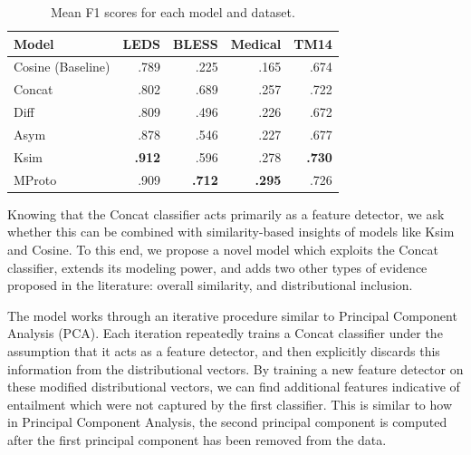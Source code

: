 \documentclass[12pt]{article}
\begin{document}
\begin{table}
\begin{center}
\begin{tabular}{|l|rrrr|}
  \hline
  Model                           &   LEDS   &  BLESS   &   Medical &      TM14  \\
  \hline
  Cosine (Baseline)               &    .789  &    .225  &    .165  &      .674  \\
  \hline
  Concat                          &    .802  &    .689  &    .257  &      .722  \\
  Diff                            &    .809  &    .496  &    .226  &      .672  \\
  Asym \cite{roller:2014:coling}  &    .878  &    .546  &    .227  &      .677  \\
  Ksim \cite{levy:2015:naacl}     &{\bf.912} &    .596  &{   .278} &  {\bf.730} \\
  MProto \cite{roller:2016:emnlp} &    .909  &{\bf.712} &{\bf.295} &      .726  \\
  \hline
\end{tabular}
\end{center}
\caption{Mean F1 scores for each model and dataset.}
\label{tab:results1}
\end{table}







Knowing that the Concat classifier acts primarily as a feature detector, we
ask whether this can be combined with similarity-based insights of models like
Ksim and Cosine. To this end, we propose a novel model which exploits the
Concat classifier, extends its modeling power, and adds two other types of
evidence proposed in the literature: overall similarity, and distributional
inclusion.


The model works through an iterative procedure similar to Principal Component
Analysis (PCA). Each iteration repeatedly trains a Concat classifier under the
assumption that it acts as a feature detector, and then explicitly discards
this information from the distributional vectors. By training a new feature
detector on these modified distributional vectors, we can find additional
features indicative of entailment which were not captured by the first
classifier. This is similar to how in Principal Component Analysis, the
second principal component is computed after the first principal component
has been removed from the data.
\end{document}

